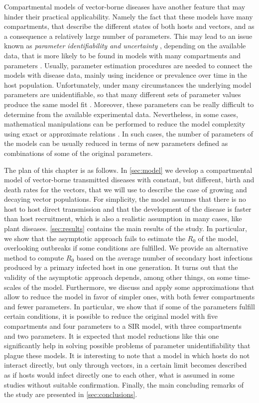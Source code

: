 Compartmental models of vector-borne diseases have another feature that may
hinder their practical applicability. Namely the fact that these models have
many compartments, that describe the different states of both hosts and
vectors, and as a consequence a relatively large number of parameters. This may
lead to an issue known as \textit{parameter identifiability and uncertainty}
\cite{Chowel2017}, depending on the available data, that is more likely to be
found in models with many compartments and parameters \cite{Roosa2019}.
Usually, parameter estimation procedures are needed to connect the models with
disease data, mainly using incidence or prevalence over time in the host
population. Unfortunately, under many circumstances the underlying model
parameters are unidentifiable, so that many different sets of parameter values
produce the same model fit \cite{Kao2018}. Moreover, these parameters can be
really difficult to determine from the available experimental data.
Nevertheless, in some cases, mathematical manipulations can be performed to
reduce the model complexity using exact or approximate relations
\cite{GimenezRomero2021}. In such cases, the number of parameters of the models
can
be usually reduced in terms of new parameters defined as combinations of some
of the original parameters.

The plan of this chapter is as follows. In \cref{sec:model} we develop a
compartmental model of vector-borne transmitted diseases with constant, but
different, birth and death rates for the vectors, that we will use to describe
the case of growing and decaying vector populations. For simplicity, the model
assumes that there is no host to host direct transmission and that the
development of the disease is faster than host recruitment, which is also a
realistic assumption in  many cases, like plant diseases. \cref{sec:results}
contains the main results of the study. In particular, we show that the
asymptotic approach fails to estimate the $R_0$ of the model, overlooking
outbreaks if some conditions are fulfilled. We provide an alternative
method to compute $R_0$ based on the average number of secondary host
infections produced by a primary infected host in one generation. It turns out
that the validity of the  asymptotic approach depends, among other things, on
some time-scales of the model. Furthermore, we discuss and apply some
approximations that allow to reduce the model in favor of simpler ones, with
both fewer compartments and fewer parameters. In particular, we show that if
some of the parameters fulfill certain conditions, it is possible to reduce the
original model with five compartments and four parameters to a SIR model, with
three compartments and two parameters. It is expected that model reductions
like this one significantly help in solving possible problems of parameter
unidentifiability that plague these models. It is interesting to note that a
model in which hosts do not interact directly, but only through vectors, in a
certain limit becomes described as if hosts would infect directly one to each
other, what is assumed in some studies without suitable confirmation. Finally,
the main concluding remarks of the study are presented in
\cref{sec:conclusions}.

